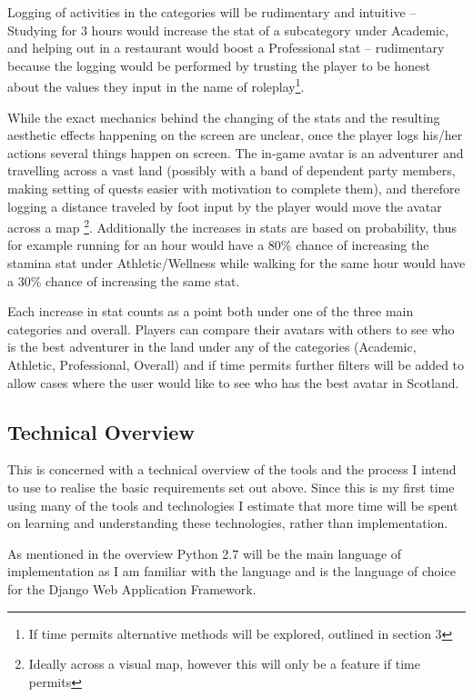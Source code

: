 \documentclass[11pt, a4paper]{article}
\begin{document}
Logging of activities in the categories will be rudimentary and intuitive -- Studying for 3 hours would increase the stat of a subcategory under Academic, and helping out in a restaurant would boost a Professional stat -- rudimentary because the logging would be performed by trusting the player to be honest about the values they input in the name of roleplay\footnote{If time permits alternative methods will be explored, outlined in section 3}.

While the exact mechanics behind the changing of the stats and the resulting aesthetic effects happening on the screen are unclear, once the player logs his/her actions several things happen on screen. The in-game avatar is an adventurer and travelling across a vast land (possibly with a band of dependent party members, making setting of quests easier with motivation to complete them), and therefore logging a distance traveled by foot input by the player would move the avatar across a map \footnote{Ideally across a visual map, however this will only be a feature if time permits}. Additionally the increases in stats are based on probability, thus for example running for an hour would have a 80\% chance of increasing the stamina stat under Athletic/Wellness while walking for the same hour would have a 30\% chance of increasing the same stat. 

Each increase in stat counts as a point both under one of the three main categories and overall. Players can compare their avatars with others to see who is the best adventurer in the land under any of the categories (Academic, Athletic, Professional, Overall) and if time permits further filters will be added to allow cases where the user would like to see who has the best avatar in Scotland.

\subsection{Technical Overview}
This is concerned with a technical overview of the tools and the process I intend to use to realise the basic requirements set out above. Since this is my first time using many of the tools and technologies I estimate that more time will be spent on learning and understanding these technologies, rather than implementation.

As mentioned in the overview Python 2.7 will be the main language of implementation as I am familiar with the language and is the language of choice for the Django Web Application Framework.
\end{document}
